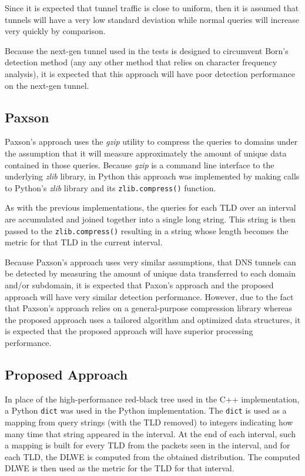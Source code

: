 \documentclass[12pt]{report}
\theoremstyle{remark}
\theoremstyle{definition}
\theoremstyle{definition}
\theoremstyle{definition}
\begin{document}
Since it is expected that tunnel traffic is close to uniform, then it is assumed
that tunnels will have a very low standard deviation while normal queries will
increase very quickly by comparison.

Because the next-gen tunnel used in the tests is designed to circumvent Born's
detection method (any any other method that relies on character frequency
analysis), it is expected that this approach will have poor detection
performance on the next-gen tunnel.

\subsection{Paxson}
Paxson's\cite{Paxson2011} approach uses the \emph{gzip} utility to compress the
queries to domains under the assumption that it will measure approximately the
amount of unique data contained in those queries. Because \emph{gzip} is a
command line interface to the underlying \emph{zlib} library, in Python this
approach was implemented by making calls to Python's \emph{zlib} library and its
\texttt{zlib.compress()} function.

As with the previous implementations, the queries for each TLD over an interval
are accumulated and joined together into a single long string. This string is
then passed to the \texttt{zlib.compress()} resulting in a string whose length
becomes the metric for that TLD in the current interval.

Because Paxson's approach uses very similar assumptions, that DNS tunnels can be
detected by measuring the amount of unique data transferred to each domain
and/or subdomain, it is expected that Paxon's approach and the proposed approach
will have very similar detection performance. However, due to the fact that
Paxson's approach relies on a general-purpose compression library whereas the
proposed approach uses a tailored algorithm and optimized data structures, it is
expected that the proposed approach will have superior processing performance.

\subsection{Proposed Approach}
\label{proposed-method-python}
In place of the high-performance red-black tree used in the C++ implementation,
a Python \texttt{dict} was used in the Python implementation. The \texttt{dict}
is used as a mapping from query strings (with the TLD removed) to integers
indicating how many time that string appeared in the interval. At the end of
each interval, such a mapping is built for every TLD from the packets seen in
the interval, and for each TLD, the DLWE is computed from the obtained
distribution. The computed DLWE is then used as the metric for the TLD for that
interval.
\end{document}
